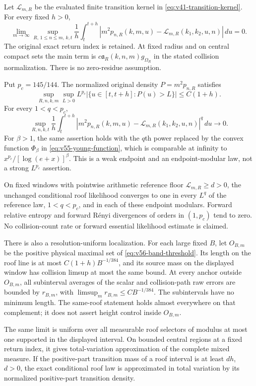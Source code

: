 \begin{leadtheorem}
\label{thm:intro-v49-local-TV}
Let $\mathcal L_{m,R}$ be the evaluated finite transition kernel in
\eqref{eq:v41-transition-kernel}. For every fixed $h>0$,
\[
 \lim_{m\to\infty}\sup_{R,\,1\le n\le m,\,k,t}
 \frac1h\int_t^{t+h}
 |m^2p_{n,R}(k,m,u)-\mathcal L_{m,R}(k_1,k_2,u,n)|\,du=0.
\]
The original exact return index is retained. At fixed radius and on
central compact sets the main term is
$c\mathfrak a_R(k,n,m)g_{\Omega_R}$ in the stated collision
normalization. There is no zero-residue assumption.

Put $p_c=145/144$. The normalized original density $P=m^2p_{n,R}$
satisfies
\[
 \sup_{R,n,k,m}\sup_{L>0} L^{p_c}
    |\{u\in[t,t+h]:P(u)>L\}|\le C(1+h).
\]
For every $1<q<p_c$,
\[
 \sup_{R,n,k,t}\frac1h\int_t^{t+h}
 |m^2p_{n,R}(k,m,u)-\mathcal L_{m,R}(k_1,k_2,u,n)|^q\,du\to0.
\]
For $\beta>1$, the same assertion holds with the $q$th power replaced
by the convex function $\Phi_\beta$ in
\eqref{eq:v55-young-function}, which is comparable at infinity to
$x^{p_c}/[\log(e+x)]^\beta$. This is a weak endpoint and an
endpoint-modular law, not a strong $L^{p_c}$ assertion.

On fixed windows with pointwise arithmetic reference floor
$\mathcal L_{m,R}\ge d>0$, the unchanged conditional roof likelihood
converges to one in every $L^q$ of the reference law, $1<q<p_c$,
and in each of these endpoint modulars. Forward relative entropy
and forward R\'enyi divergences of orders in $(1,p_c)$ tend to zero.
No collision-count rate or forward essential likelihood estimate
is claimed.

There is also a resolution-uniform localization. For each large fixed
$B$, let $O_{B,m}$ be the positive physical maximal set of
\eqref{eq:v56-band-threshold}. Its length on the roof line is at most
$C(1+h)B^{-1/384}$, and its source mass on the displayed window has
collision limsup at most the same bound. At every anchor outside
$O_{B,m}$, all subinterval averages of the scalar and collision-path
raw errors are bounded by $r_{B,m}$, with
$\limsup_m r_{B,m}\le CB^{-1/384}$. The subintervals have no minimum
length. The same-roof statement holds almost everywhere on that
complement; it does not assert height control inside $O_{B,m}$.

The same limit is uniform over all measurable roof selectors of
modulus at most one supported in the displayed interval. On bounded
central regions at a fixed return index, it gives total-variation
approximation of the complete mixed measure. If the positive-part
transition mass of a roof interval is at least $dh$, $d>0$, the exact
conditional roof law is approximated in total variation by its
normalized positive-part transition density.
\end{leadtheorem}
